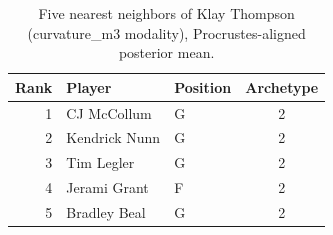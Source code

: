 \begin{table}[htbp]
  \centering\small
  \begin{tabular}{rllc}
    \toprule
    Rank & Player & Position & Archetype \\
    \midrule
    1 & CJ McCollum & G & 2 \\
    2 & Kendrick Nunn & G & 2 \\
    3 & Tim Legler & G & 2 \\
    4 & Jerami Grant & F & 2 \\
    5 & Bradley Beal & G & 2 \\
    \bottomrule
  \end{tabular}
  \caption{Five nearest neighbors of Klay Thompson (curvature_m3 modality), Procrustes-aligned posterior mean.}
  \label{tab:Klay_Thompson_neighbors_curvature_m3}
\end{table}

